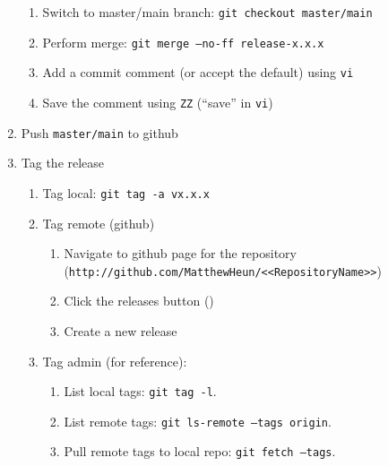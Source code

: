 \documentclass{article}
\begin{document}
\begin{enumerate}
\begin{enumerate}
    \item Switch to master/main branch: \texttt{git checkout master/main} 

    \item Perform merge: \texttt{git merge --no-ff release-x.x.x}
	
	\item Add a commit comment (or accept the default) using \texttt{vi} 
	
	\item Save the comment using \texttt{ZZ} (``save'' in \texttt{vi})
	
  \end{enumerate}
  \item Push \texttt{master/main} to github
  
  \item Tag the release
  \begin{enumerate}

    \item Tag local: \texttt{git tag -a vx.x.x}

    \item Tag remote (github)
	\begin{enumerate}

	  \item Navigate to github page for the repository\\
	  		(\texttt{http://github.com/MatthewHeun/<<RepositoryName>>})

	  \item Click the releases button ()
	  
	  \item Create a new release

	\end{enumerate}
	\item Tag admin (for reference):
	\begin{enumerate}

	  \item List local tags: \texttt{git tag -l}.
	
	  \item List remote tags: \texttt{git ls-remote --tags origin}.

	  \item Pull remote tags to local repo: \texttt{git fetch --tags}.
	

\end{enumerate}
\end{enumerate}
\end{enumerate}
\end{document}
